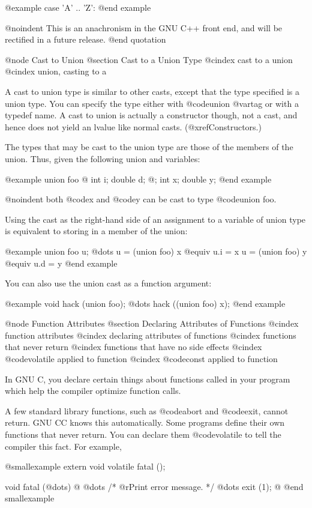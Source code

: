 {@example
case 'A' .. 'Z':
@end example

@noindent
This is an anachronism in the GNU C++ front end, and will be rectified
in a future release.
@end quotation

@node Cast to Union
@section Cast to a Union Type
@cindex cast to a union
@cindex union, casting to a 

A cast to union type is similar to other casts, except that the type
specified is a union type.  You can specify the type either with
@code{union @var{tag}} or with a typedef name.  A cast to union is actually
a constructor though, not a cast, and hence does not yield an lvalue like
normal casts.  (@xref{Constructors}.)

The types that may be cast to the union type are those of the members
of the union.  Thus, given the following union and variables:

@example
union foo @{ int i; double d; @};
int x;
double y;
@end example

@noindent
both @code{x} and @code{y} can be cast to type @code{union} foo.

Using the cast as the right-hand side of an assignment to a variable of
union type is equivalent to storing in a member of the union:

@example
union foo u;
@dots{}
u = (union foo) x  @equiv{}  u.i = x
u = (union foo) y  @equiv{}  u.d = y
@end example

You can also use the union cast as a function argument:

@example
void hack (union foo);
@dots{}
hack ((union foo) x);
@end example

@node Function Attributes
@section Declaring Attributes of Functions
@cindex function attributes
@cindex declaring attributes of functions
@cindex functions that never return
@cindex functions that have no side effects
@cindex @code{volatile} applied to function
@cindex @code{const} applied to function

In GNU C, you declare certain things about functions called in your program
which help the compiler optimize function calls.

A few standard library functions, such as @code{abort} and @code{exit},
cannot return.  GNU CC knows this automatically.  Some programs define
their own functions that never return.  You can declare them
@code{volatile} to tell the compiler this fact.  For example,

@smallexample
extern void volatile fatal ();

void
fatal (@dots{})
@{
  @dots{} /* @r{Print error message.} */ @dots{}
  exit (1);
@}
@end smallexample

}
